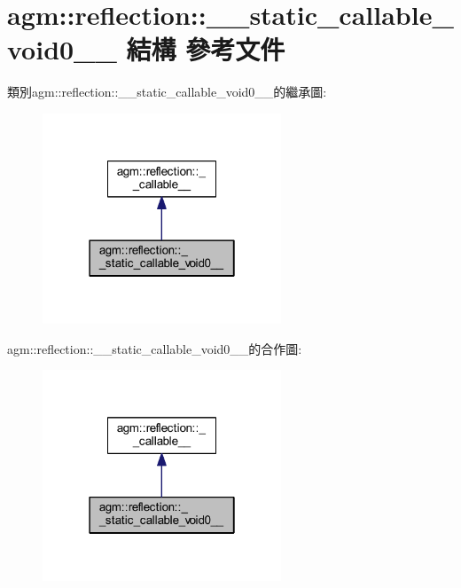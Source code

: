 \hypertarget{structagm_1_1reflection_1_1____static__callable__void0____}{}\section{agm\+:\+:reflection\+:\+:\+\_\+\+\_\+static\+\_\+callable\+\_\+void0\+\_\+\+\_\+ 結構 參考文件}
\label{structagm_1_1reflection_1_1____static__callable__void0____}


類別agm\+:\+:reflection\+:\+:\+\_\+\+\_\+static\+\_\+callable\+\_\+void0\+\_\+\+\_\+的繼承圖\+:\nopagebreak
\begin{figure}[H]
\begin{center}
\leavevmode
\includegraphics[width=202pt]{structagm_1_1reflection_1_1____static__callable__void0______inherit__graph}
\end{center}
\end{figure}


agm\+:\+:reflection\+:\+:\+\_\+\+\_\+static\+\_\+callable\+\_\+void0\+\_\+\+\_\+的合作圖\+:\nopagebreak
\begin{figure}[H]
\begin{center}
\leavevmode
\includegraphics[width=202pt]{structagm_1_1reflection_1_1____static__callable__void0______coll__graph}
\end{center}
\end{figure}
